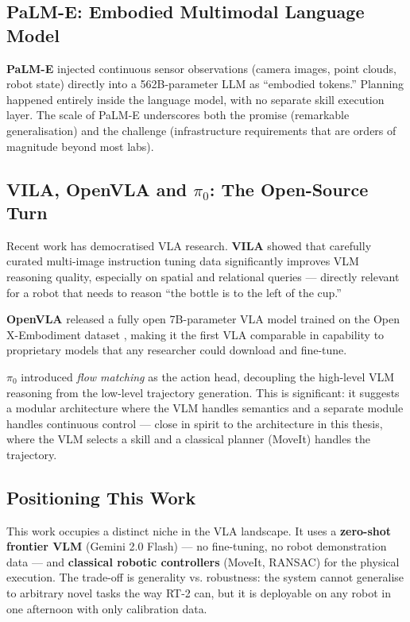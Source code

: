 \subsection{PaLM-E: Embodied Multimodal Language Model}

\textbf{PaLM-E} \cite{driess2023palme} injected continuous sensor observations
(camera images, point clouds, robot state) directly into a 562B-parameter LLM as
``embodied tokens.''
Planning happened entirely inside the language model, with no separate skill execution
layer.
The scale of PaLM-E underscores both the promise (remarkable generalisation) and the
challenge (infrastructure requirements that are orders of magnitude beyond most labs).

\subsection{VILA, OpenVLA and \boldmath$\pi_0$: The Open-Source Turn}

Recent work has democratised VLA research.
\textbf{VILA} \cite{lin2024vila} showed that carefully curated multi-image instruction
tuning data significantly improves VLM reasoning quality, especially on spatial and
relational queries --- directly relevant for a robot that needs to reason
``the bottle is to the left of the cup.''

\textbf{OpenVLA} \cite{kim2024openvla} released a fully open 7B-parameter VLA model
trained on the Open X-Embodiment dataset \cite{brohan2022rt1}, making it the first
VLA comparable in capability to proprietary models that any researcher could download
and fine-tune.

\textbf{$\pi_0$} \cite{black2024pi0} introduced \emph{flow matching} as the action
head, decoupling the high-level VLM reasoning from the low-level trajectory generation.
This is significant: it suggests a modular architecture where the VLM handles semantics
and a separate module handles continuous control --- close in spirit to the architecture
in this thesis, where the VLM selects a skill and a classical planner (MoveIt) handles
the trajectory.

\subsection{Positioning This Work}

This work occupies a distinct niche in the VLA landscape.
It uses a \textbf{zero-shot frontier VLM} (Gemini 2.0 Flash) --- no fine-tuning, no
robot demonstration data --- and \textbf{classical robotic controllers} (MoveIt, RANSAC)
for the physical execution.
The trade-off is generality vs. robustness: the system cannot generalise to arbitrary
novel tasks the way RT-2 can, but it is deployable on any robot in one afternoon with
only calibration data.


